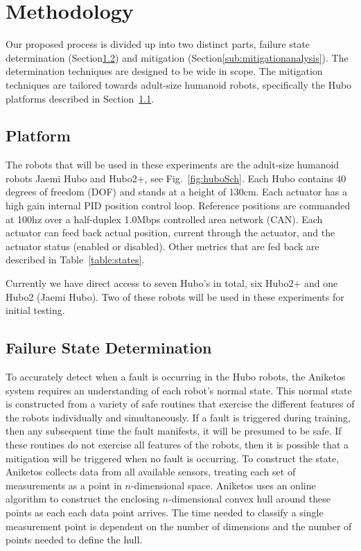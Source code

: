\section{Methodology}

Our proposed process is divided up into two distinct parts, failure state 
determination (Section\ref{sub:FailureStateDetermination}) and mitigation (Section\ref{sub:mitigationanalysis}).  
The determination techniques are designed to be wide in scope.  
The mitigation techniques are tailored towards adult-size
humanoid robots, specifically the Hubo platforms described in Section~\ref{sec:platform}.

 
\subsection{Platform}\label{sec:platform}
The robots that will be used in these experiments are the adult-size 
humanoid robots Jaemi Hubo and Hubo2+, see Fig.~\ref{fig:huboSch}.  
Each Hubo contains 40 degrees of freedom (DOF) and stands at a height of 130cm.
Each actuator has a high gain internal PID position control loop.  Reference positions are
commanded at 100hz over a half-duplex 1.0Mbps controlled area network (CAN).
Each actuator can feed back actual position, current through the actuator, and the actuator status 
(enabled or disabled).  Other metrics that are fed back are described in 
Table~\ref{table:states}.  


Currently we have direct access to seven Hubo's in total, six Hubo2+ and one Hubo2 (Jaemi Hubo).
Two of these robots will be used in these experiments for initial testing.



\subsection{Failure State Determination}
\label{sub:FailureStateDetermination}
To accurately detect when a fault is occurring in the Hubo robots, the Aniketos system requires an understanding of each robot's normal state. This normal state is constructed from a variety of safe routines that exercise the different features of the robots individually and simultaneously. If a fault is triggered during training, then any subsequent time the fault manifests, it will be presumed to be safe. If these routines do not exercise all features of the robots, then it is possible that a mitigation will be triggered when no fault is occurring. To construct the state, Aniketos collects data from all available sensors, treating each set of measurements as a point in $n$-dimensional space. Aniketos uses an online algorithm to construct the enclosing $n$-dimensional convex hull around these points as each each data point arrives. The time needed to classify a single measurement point is dependent on the number of dimensions and the number of points needed to define the hull.


